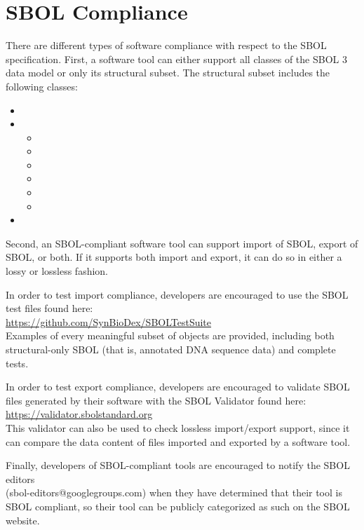 \section{SBOL Compliance}

There are different types of software compliance with respect to the SBOL specification.  First, a software tool can either support all classes of the SBOL 3 data model or only its structural subset.  The structural subset includes the following classes:
\begin{itemize}
\item {}
\item {}
\begin{itemize}
\item {}
\item {}
\item {}
\item {}
\item {}
\item {}
\end{itemize}
\item {}
\end{itemize}
Second, an SBOL-compliant software tool can support import of SBOL, export of SBOL, or both.  
If it supports both import and export, it can do so in either a lossy or lossless fashion.

In order to test import compliance, developers are encouraged to use the SBOL test files found here:\\ {\url{https://github.com/SynBioDex/SBOLTestSuite}}\\
Examples of every meaningful subset of objects are provided, including both structural-only SBOL (that is, annotated DNA sequence data) and complete tests.  

In order to test export compliance, developers are encouraged to validate SBOL files generated by their software with the SBOL Validator found here:\\
\url{https://validator.sbolstandard.org}\\
This validator can also be used to check lossless import/export support, since it can compare the data content of files imported and exported by a software tool.

Finally, developers of SBOL-compliant tools are encouraged to notify the SBOL editors\\(sbol-editors@googlegroups.com) when they have determined that their tool is SBOL compliant, so their tool can be publicly categorized as such on the SBOL website.


